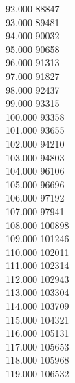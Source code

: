 { 92.000	88847 \\
 93.000	89481 \\
 94.000	90032 \\
 95.000	90658 \\
 96.000	91313 \\
 97.000	91827 \\
 98.000	92437 \\
 99.000	93315 \\
 100.000	93358 \\
 101.000	93655 \\
 102.000	94210 \\
 103.000	94803 \\
 104.000	96106 \\
 105.000	96696 \\
 106.000	97192 \\
 107.000	97941 \\
 108.000	100898 \\
 109.000	101246 \\
 110.000	102011 \\
 111.000	102314 \\
 112.000	102943 \\
 113.000	103304 \\
 114.000	103709 \\
 115.000	104321 \\
 116.000	105131 \\
 117.000	105653 \\
 118.000	105968 \\
 119.000	106532 \\
}
